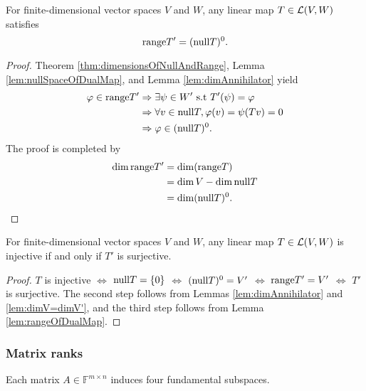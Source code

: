 \begin{lem}
  \label{lem:rangeOfDualMap}
  For finite-dimensional vector spaces $V$ and $W$,
   any linear map $T\in {\cal L}(V, W)$ satisfies
  \begin{equation}
    \label{eq:rangeOfDualMap}
    \mathrm{range} T' = (\mathrm{null} T)^0.
  \end{equation}
\end{lem}
\begin{proof}
  Theorem \ref{thm:dimensionsOfNullAndRange}, 
  Lemma \ref{lem:nullSpaceOfDualMap},
  and Lemma \ref{lem:dimAnnihilator}
  yield
  \begin{align*}
    \varphi \in \mathrm{range} T' 
    &\Rightarrow
      \exists \psi\in W' \text{ s.t }
      T'(\psi) = \varphi
    \\
    &\Rightarrow 
      \forall v\in \mathrm{null} T, \varphi(v) = \psi(Tv) = 0
    \\
    &\Rightarrow 
      \varphi \in (\mathrm{null} T)^0.
  \end{align*}
  The proof is completed by
  \begin{align*}
    \dim \mathrm{range} T' &= \dim (\mathrm{range} T)
    \\
                   &= \dim V - \dim \mathrm{null} T 
    \\
                   &= \dim (\mathrm{null} T)^0.
      \qedhere
  \end{align*}
\end{proof}

\begin{coro}
  \label{coro:Tinjective2dualTsurjective}
  For finite-dimensional vector spaces $V$ and $W$,
   any linear map $T\in {\cal L}(V, W)$
   is injective if and only if
   $T'$ is surjective.
\end{coro}
\begin{proof}
  $T$ is injective $\Leftrightarrow$ $\mathrm{null} T=\{0\}$
  $\Leftrightarrow$ $(\mathrm{null} T)^0 = V'$
  $\Leftrightarrow$ $\mathrm{range} T' = V'$
  $\Leftrightarrow$ $T'$ is surjective.
  The second step follows from 
   Lemmas \ref{lem:dimAnnihilator} and \ref{lem:dimV=dimV'},
   and the third step follows from
   Lemma \ref{lem:rangeOfDualMap}.
\end{proof}


\subsubsection{Matrix ranks}
\label{sec:matrix-ranks}

\begin{rem}
  Each matrix $A\in \mathbb{F}^{m\times n}$
   induces four fundamental subspaces.
\end{rem}

